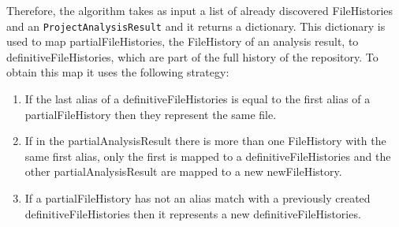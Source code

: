Therefore, the algorithm takes as input a list of already discovered FileHistories and an \texttt{ProjectAnalysisResult} and it returns a dictionary.
This dictionary is used to map partialFileHistories, the FileHistory of an analysis result, to definitiveFileHistories, which are part of the full history of the repository. 
To obtain this map it uses the following strategy:
\begin{enumerate}
    \item If the last alias of a definitiveFileHistories is equal to the first alias of a partialFileHistory then they represent the same file.
    \item If in the partialAnalysisResult there is more than one FileHistory with the same first alias, only the first is mapped to a definitiveFileHistories and the other partialAnalysisResult are mapped to a new newFileHistory.
    \item If a partialFileHistory has not an alias match with a previously created definitiveFileHistories then it represents a new definitiveFileHistories.
\end{enumerate}

        

